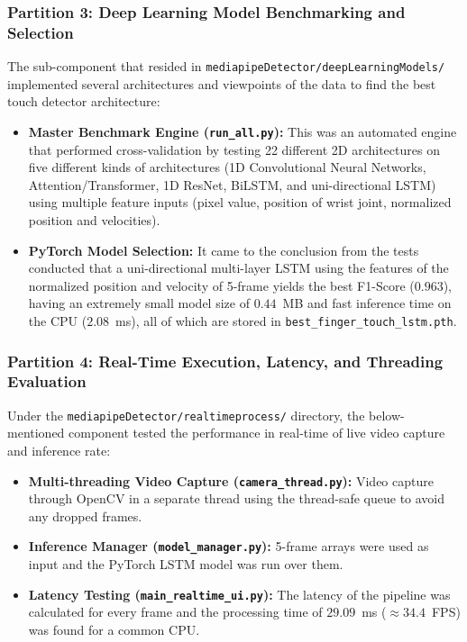 \subsubsection{Partition 3: Deep Learning Model Benchmarking and Selection}
The sub-component that resided in \texttt{mediapipeDetector/deepLearningModels/} implemented several architectures and viewpoints of the data to find the best touch detector architecture:
\begin{itemize}
    \item \textbf{Master Benchmark Engine (\texttt{run\_all.py}):} This was an automated engine that performed cross-validation by testing 22 different 2D architectures on five different kinds of architectures (1D Convolutional Neural Networks, Attention/Transformer, 1D ResNet, BiLSTM, and uni-directional LSTM) using multiple feature inputs (pixel value, position of wrist joint, normalized position and velocities).
    \item \textbf{PyTorch Model Selection:} It came to the conclusion from the tests conducted that a uni-directional multi-layer LSTM using the features of the normalized position and velocity of 5-frame yields the best F1-Score ($0.963$), having an extremely small model size of $0.44$~MB and fast inference time on the CPU ($2.08$~ms), all of which are stored in \texttt{best\_finger\_touch\_lstm.pth}.
\end{itemize}

\subsubsection{Partition 4: Real-Time Execution, Latency, and Threading Evaluation}
Under the \texttt{mediapipeDetector/realtimeprocess/} directory, the below-mentioned component tested the performance in real-time of live video capture and inference rate:
\begin{itemize}
    \item \textbf{Multi-threading Video Capture (\texttt{camera\_thread.py}):} Video capture through OpenCV in a separate thread using the thread-safe queue to avoid any dropped frames.
    \item \textbf{Inference Manager (\texttt{model\_manager.py}):} 5-frame arrays were used as input and the PyTorch LSTM model was run over them.
    \item \textbf{Latency Testing (\texttt{main\_realtime\_ui.py}):} The latency of the pipeline was calculated for every frame and the processing time of $29.09$~ms ($\approx 34.4$~FPS) was found for a common CPU.
\end{itemize}


